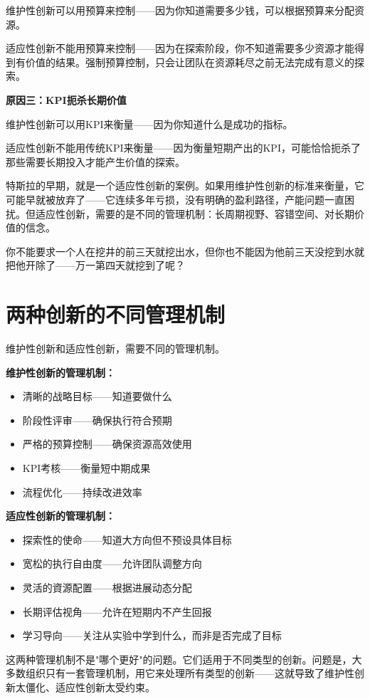 维护性创新可以用预算来控制——因为你知道需要多少钱，可以根据预算来分配资源。

适应性创新不能用预算来控制——因为在探索阶段，你不知道需要多少资源才能得到有价值的结果。强制预算控制，只会让团队在资源耗尽之前无法完成有意义的探索。

\textbf{原因三：KPI扼杀长期价值}

维护性创新可以用KPI来衡量——因为你知道什么是成功的指标。

适应性创新不能用传统KPI来衡量——因为衡量短期产出的KPI，可能恰恰扼杀了那些需要长期投入才能产生价值的探索。

特斯拉的早期，就是一个适应性创新的案例。如果用维护性创新的标准来衡量，它可能早就被放弃了——它连续多年亏损，没有明确的盈利路径，产能问题一直困扰。但适应性创新，需要的是不同的管理机制：长周期视野、容错空间、对长期价值的信念。

你不能要求一个人在挖井的前三天就挖出水，但你也不能因为他前三天没挖到水就把他开除了——万一第四天就挖到了呢？

\section{两种创新的不同管理机制}


维护性创新和适应性创新，需要不同的管理机制。

\textbf{维护性创新的管理机制：}

\begin{itemize}
\item 清晰的战略目标——知道要做什么
\item 阶段性评审——确保执行符合预期
\item 严格的预算控制——确保资源高效使用
\item KPI考核——衡量短中期成果
\item 流程优化——持续改进效率

\end{itemize}
\textbf{适应性创新的管理机制：}

\begin{itemize}
\item 探索性的使命——知道大方向但不预设具体目标
\item 宽松的执行自由度——允许团队调整方向
\item 灵活的資源配置——根据进展动态分配
\item 长期评估视角——允许在短期内不产生回报
\item 学习导向——关注从实验中学到什么，而非是否完成了目标

\end{itemize}
这两种管理机制不是"哪个更好"的问题。它们适用于不同类型的创新。问题是，大多数组织只有一套管理机制，用它来处理所有类型的创新——这就导致了维护性创新太僵化、适应性创新太受约束。

